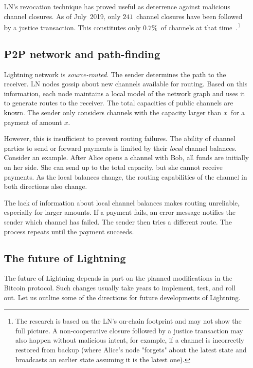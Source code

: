 LN's revocation technique has proved useful as deterrence against malicious channel closures.
As of July~2019, only $241$~channel closures have been followed by a justice transaction.
This constitutes only $0.7\%$~of channels at that time~\cite{BitMEXLN3}.\footnote{The research is based on the LN's on-chain footprint and may not show the full picture. A non-cooperative closure followed by a justice transaction may also happen without malicious intent, for example, if a channel is incorrectly restored from backup (where Alice's node "forgets" about the latest state and broadcasts an earlier state assuming it is the latest one).}


\subsection{P2P network and path-finding}

Lightning network is \textit{source-routed}.
The sender determines the path to the receiver.
LN nodes gossip about new channels available for routing.
Based on this information, each node maintains a local model of the network graph and uses it to generate routes to the receiver.
The total capacities of public channels are known.
The sender only considers channels with the capacity larger than $x$~for a payment of amount $x$.

However, this is insufficient to prevent routing failures.
The ability of channel parties to send or forward payments is limited by their \textit{local} channel balances.
Consider an example.
After Alice opens a channel with Bob, all funds are initially on her side.
She can send up to the total capacity, but she cannot receive payments.
As the local balances change, the routing capabilities of the channel in both directions also change.

The lack of information about local channel balances makes routing unreliable, especially for larger amounts.
If a payment fails, an error message notifies the sender which channel has failed.
The sender then tries a different route.
The process repeats until the payment succeeds.


\subsection{The future of Lightning}

The future of Lightning depends in part on the planned modifications in the Bitcoin protocol.
Such changes usually take years to implement, test, and roll out.
Let us outline some of the directions for future developments of Lightning.

